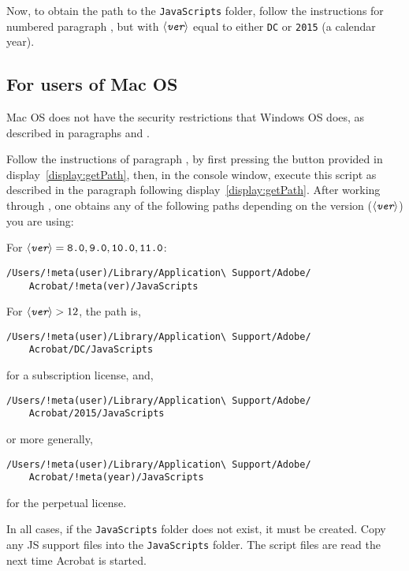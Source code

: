 \documentclass{article}
\def\app#1{\textsf{#1}}
\def\amtIndent{\parindent}
\def\meta#1{$\langle\textit{\texttt{#1}}\rangle$}
\def\SC#1{{\small#1}}
\begin{document}
Now, to obtain the path to the \texttt{JavaScripts} folder, follow the
instructions for numbered paragraph , but with \meta{ver} equal
to either \texttt{DC} or \texttt{2015} (a calendar year).


\subsection{For users of \app{Mac OS}}

\app{Mac OS} does not have the security restrictions that \app{Windows OS}
does, as described in paragraphs  and .

Follow the instructions of paragraph , by first pressing the button
provided in display~\eqref{display:getPath}, then, in the console window,
execute this script as described in the paragraph following
display~\eqref{display:getPath}. After working through , one
obtains any of the following paths depending on the version (\meta{ver}) you
are using:\medskip

\noindent
For $\text{\meta{ver}} = \texttt{8.0}, \texttt{9.0}, \texttt{10.0},
\texttt{11.0}$:
\begin{Verbatim}[xleftmargin=\amtIndent,fontsize=\small,commandchars=!()]
/Users/!meta(user)/Library/Application\ Support/Adobe/
    Acrobat/!meta(ver)/JavaScripts
\end{Verbatim}
\medskip

\noindent
For $\text{\meta{ver}} > 12$, the path is,
\begin{Verbatim}[xleftmargin=\amtIndent,fontsize=\small,commandchars=!()]
/Users/!meta(user)/Library/Application\ Support/Adobe/
    Acrobat/DC/JavaScripts
\end{Verbatim}
for a subscription license, and,
\begin{Verbatim}[xleftmargin=\amtIndent,fontsize=\small,commandchars=!()]
/Users/!meta(user)/Library/Application\ Support/Adobe/
    Acrobat/2015/JavaScripts
\end{Verbatim}
or more generally,
\begin{Verbatim}[xleftmargin=\amtIndent,fontsize=\small,commandchars=!()]
/Users/!meta(user)/Library/Application\ Support/Adobe/
    Acrobat/!meta(year)/JavaScripts
\end{Verbatim}
for the perpetual license.

In all cases, if the \texttt{JavaScripts} folder does not exist, it must
be created. Copy any \SC{JS} support files into the \texttt{JavaScripts}
folder. The script files are read the next time \app{Acrobat} is started.
\end{document}
